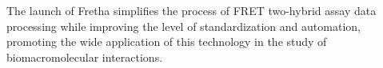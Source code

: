 \begin{eabstract}
The launch of Fretha simplifies the process of FRET two-hybrid assay data processing while improving the level of standardization and automation, promoting the wide application of this technology in the study of biomacromolecular interactions.
\end{eabstract}

